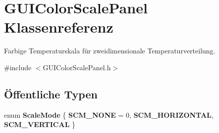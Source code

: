 \hypertarget{classGUIColorScalePanel}{\section{G\-U\-I\-Color\-Scale\-Panel Klassenreferenz}
\label{classGUIColorScalePanel}
}


Farbige Temperaturskala für zweidimensionale Temperaturverteilung.  




{\ttfamily \#include $<$G\-U\-I\-Color\-Scale\-Panel.\-h$>$}

\subsection*{Öffentliche Typen}
\begin{DoxyCompactItemize}
\item 
enum {\bfseries Scale\-Mode} \{ {\bfseries S\-C\-M\-\_\-\-N\-O\-N\-E} = 0, 
{\bfseries S\-C\-M\-\_\-\-H\-O\-R\-I\-Z\-O\-N\-T\-A\-L}, 
{\bfseries S\-C\-M\-\_\-\-V\-E\-R\-T\-I\-C\-A\-L}
 \}
\end{DoxyCompactItemize}

